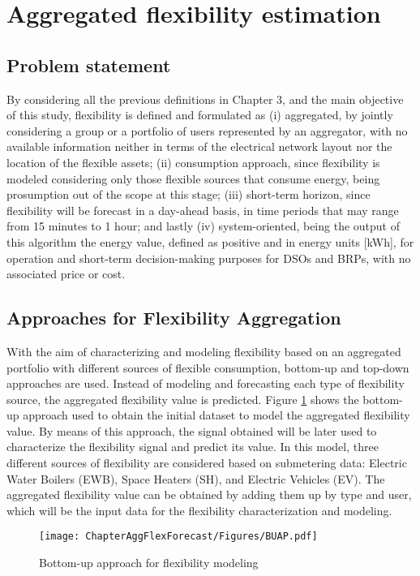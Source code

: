 \section{Aggregated flexibility estimation}\label{Sect:ProblemStatement}

\subsection{Problem statement} \label{sec:problemstatement}
By considering all the previous definitions in Chapter 3, and the main objective of this study, flexibility is defined and formulated as (i) aggregated, by jointly considering a group or a portfolio of users represented by an aggregator, with no available information neither in terms of the electrical network layout nor the location of the flexible assets; (ii) consumption approach, since flexibility is modeled considering only those flexible sources that consume energy, being prosumption out of the scope at this stage; (iii) short-term horizon, since flexibility will be forecast in a day-ahead basis, in time periods that may range from 15 minutes to 1 hour; and lastly (iv) system-oriented, being the output of this algorithm the energy value, defined as positive and in energy units [kWh], for operation and short-term decision-making purposes for DSOs and BRPs, with no associated price or cost. 

\subsection{Approaches for Flexibility Aggregation}
With the aim of characterizing and modeling flexibility based on an aggregated portfolio with different sources of flexible consumption, bottom-up and top-down approaches are used. Instead of modeling and forecasting each type of flexibility source, the aggregated flexibility value is predicted. Figure \ref{fig:bottom_up} shows the bottom-up approach used to obtain the initial dataset to model the aggregated flexibility value. By means of this approach, the signal obtained will be later used to characterize the flexibility signal and predict its value. In this model, three different sources of flexibility are considered based on submetering data: Electric Water Boilers (EWB), Space Heaters (SH), and Electric Vehicles (EV). The aggregated flexibility value can be obtained by adding them up by type and user, which will be the input data for the flexibility characterization and modeling.

\begin{figure}[htbp]
\centerline{\texttt{[image: ChapterAggFlexForecast/Figures/BUAP.pdf]}}
\caption{Bottom-up approach for flexibility modeling}
\label{fig:bottom_up}
\end{figure}

